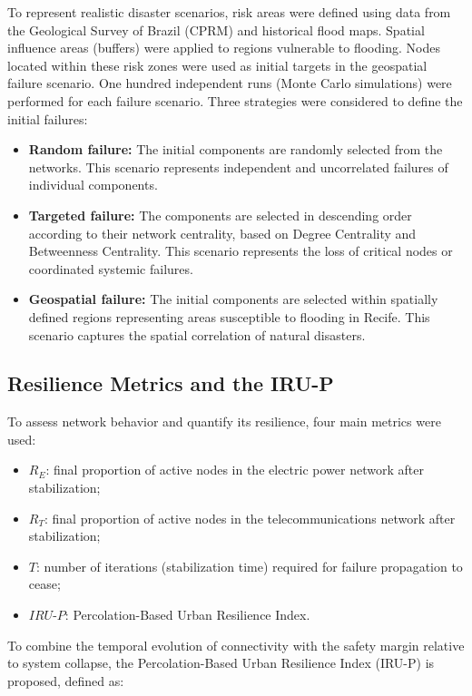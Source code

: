 \documentclass[journal]{IEEEtran}
\begin{document}
To represent realistic disaster scenarios, risk areas were defined using data from the Geological Survey of Brazil (CPRM) and historical flood maps. Spatial influence areas (buffers) were applied to regions vulnerable to flooding. Nodes located within these risk zones were used as initial targets in the geospatial failure scenario.
One hundred independent runs (Monte Carlo simulations) were performed for each failure scenario. Three strategies were considered to define the initial failures:


\begin{itemize}
\item \textbf{Random failure:} The initial components are randomly selected from the networks. This scenario represents independent and uncorrelated failures of individual components.
\item \textbf{Targeted failure:} The components are selected in descending order according to their network centrality, based on Degree Centrality and Betweenness Centrality. This scenario represents the loss of critical nodes or coordinated systemic failures.
\item \textbf{Geospatial failure:} The initial components are selected within spatially defined regions representing areas susceptible to flooding in Recife. This scenario captures the spatial correlation of natural disasters.
\end{itemize}


\subsection{Resilience Metrics and the IRU-P}
To assess network behavior and quantify its resilience, four main metrics were used:

\begin{itemize}
\item $R_E$: final proportion of active nodes in the electric power network after stabilization;
\item $R_T$: final proportion of active nodes in the telecommunications network after stabilization;
\item $T$: number of iterations (stabilization time) required for failure propagation to cease;
\item $IRU$-$P$: Percolation-Based Urban Resilience Index.
\end{itemize}

To combine the temporal evolution of connectivity with the safety margin relative to system collapse, the Percolation-Based Urban Resilience Index (IRU-P) is proposed, defined as:
\end{document}
